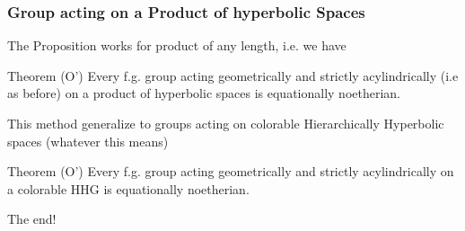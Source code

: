 \documentclass{beamer}[10]
\begin{document}
\begin{frame}
    \frametitle{Group acting on a Product of hyperbolic Spaces}

    The Proposition works for product of any length, i.e. we have
    \pause
    \begin{block}{Theorem (O')}
        Every f.g. group acting  geometrically and strictly acylindrically (i.e as before) on a product of hyperbolic spaces is equationally noetherian.
    \end{block}\pause

    This method generalize to groups acting on colorable Hierarchically Hyperbolic spaces (whatever this means)
    \pause
    \begin{block}{Theorem (O')}
        Every f.g. group acting geometrically and strictly acylindrically on a colorable HHG is equationally noetherian.
    \end{block}
    \pause
    \begin{center}
        {\huge The end!}
    \end{center}


\end{frame}
\end{document}
